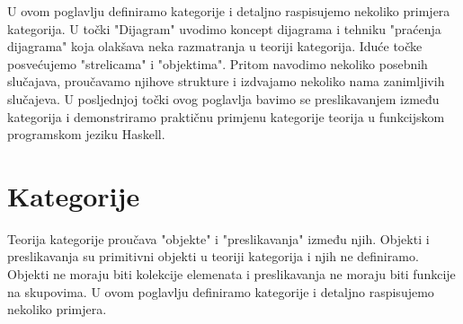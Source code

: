   U ovom poglavlju definiramo kategorije i detaljno raspisujemo nekoliko
  primjera kategorija. 
  U točki "Dijagram" uvodimo koncept dijagrama i tehniku "praćenja
  dijagrama" koja olakšava neka razmatranja u teoriji kategorija.
  Iduće točke posvećujemo  "strelicama" i "objektima". Pritom navodimo nekoliko
  posebnih slučajava, proučavamo njihove strukture i izdvajamo nekoliko nama
  zanimljivih slučajeva.
  U posljednjoj točki ovog poglavlja bavimo se preslikavanjem između kategorija i
  demonstriramo praktičnu primjenu kategorije teorija u funkcijskom programskom jeziku Haskell.

  \section{Kategorije}
  Teorija kategorije proučava "objekte" i "preslikavanja" između
  njih. Objekti i preslikavanja su primitivni objekti u teoriji kategorija i
  njih ne definiramo. Objekti ne moraju biti kolekcije elemenata i
  preslikavanja ne moraju biti funkcije na skupovima.
  U ovom poglavlju definiramo kategorije i detaljno raspisujemo nekoliko
  primjera.
